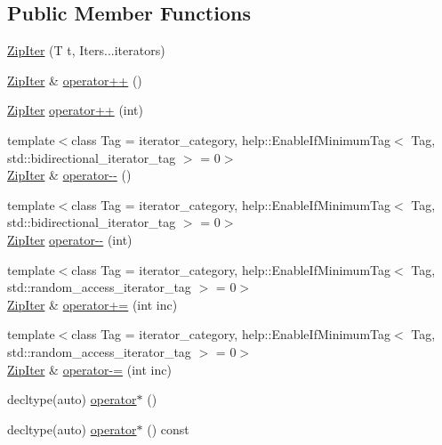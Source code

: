 \subsection*{Public Member Functions}
\begin{DoxyCompactItemize}
\item 
\hyperlink{classit_1_1ZipIter_ab2a9f6f0cd778ac23c90012f55c758c2}{Zip\+Iter} (T t, Iters...\+iterators)
\item 
\hyperlink{classit_1_1ZipIter}{Zip\+Iter} \& \hyperlink{classit_1_1ZipIter_adbf3de784c38719b5cb872892a16c731}{operator++} ()
\item 
\hyperlink{classit_1_1ZipIter}{Zip\+Iter} \hyperlink{classit_1_1ZipIter_a6684112a9fe66a1faafcc7db208151be}{operator++} (int)
\item 
{\footnotesize template$<$class Tag  = iterator\+\_\+category, help\+::\+Enable\+If\+Minimum\+Tag$<$ Tag, std\+::bidirectional\+\_\+iterator\+\_\+tag $>$  = 0$>$ }\\\hyperlink{classit_1_1ZipIter}{Zip\+Iter} \& \hyperlink{classit_1_1ZipIter_a7b506bc6732ad99647832584f1c60871}{operator-\/-\/} ()
\item 
{\footnotesize template$<$class Tag  = iterator\+\_\+category, help\+::\+Enable\+If\+Minimum\+Tag$<$ Tag, std\+::bidirectional\+\_\+iterator\+\_\+tag $>$  = 0$>$ }\\\hyperlink{classit_1_1ZipIter}{Zip\+Iter} \hyperlink{classit_1_1ZipIter_a5c5eaf490cdbc81d9a12e85bcf57c5d4}{operator-\/-\/} (int)
\item 
{\footnotesize template$<$class Tag  = iterator\+\_\+category, help\+::\+Enable\+If\+Minimum\+Tag$<$ Tag, std\+::random\+\_\+access\+\_\+iterator\+\_\+tag $>$  = 0$>$ }\\\hyperlink{classit_1_1ZipIter}{Zip\+Iter} \& \hyperlink{classit_1_1ZipIter_a69491fe6321ccfbc4d51be01c8b559d4}{operator+=} (int inc)
\item 
{\footnotesize template$<$class Tag  = iterator\+\_\+category, help\+::\+Enable\+If\+Minimum\+Tag$<$ Tag, std\+::random\+\_\+access\+\_\+iterator\+\_\+tag $>$  = 0$>$ }\\\hyperlink{classit_1_1ZipIter}{Zip\+Iter} \& \hyperlink{classit_1_1ZipIter_a9a6cb86e96e7a1048485ca8c41d42a6e}{operator-\/=} (int inc)
\item 
decltype(auto) \hyperlink{classit_1_1ZipIter_ad6189711d25710055d6298a36ebc1db8}{operator$\ast$} ()
\item 
decltype(auto) \hyperlink{classit_1_1ZipIter_a59fe8b11666599ec7a57d379df8ec7ad}{operator$\ast$} () const 
\end{DoxyCompactItemize}
